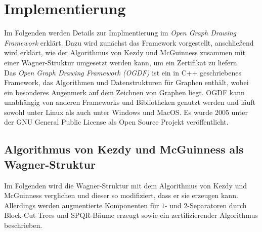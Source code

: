 \chapter{Implementierung}
\label{cha:implementierung}

Im Folgenden werden Details zur Implmentierung im \emph{Open Graph Drawing Framework} erklärt.
Dazu wird zunächst das Framework vorgestellt, anschließend wird erklärt, wie der Algorithmus von Kezdy und McGuinness zusammen mit einer Wagner-Struktur umgesetzt werden kann, um ein Zertifikat zu liefern.
\ \\

Das \emph{Open Graph Drawing Framework (OGDF)} ist ein in C++ geschriebenes Framework, das Algorithmen und Datenstrukturen für Graphen enthält, wobei ein besonderes Augenmerk auf dem Zeichnen von Graphen liegt.
OGDF kann unabhängig von anderen Frameworks und Bibliotheken genutzt werden und läuft sowohl unter Linux als auch unter Windows und MacOS.
Es wurde 2005 unter der GNU General Public License als Open Source Projekt veröffentlicht\cite{OGDFAbout}\cite{CGJK+2014}.

\section{Algorithmus von Kezdy und McGuinness als Wagner-Struktur}
Im Folgenden wird die Wagner-Struktur mit dem Algorithmus von Kezdy und McGuinness verglichen und dieser so modifiziert, dass er sie erzeugen kann.
Allerdings werden augmentierte Komponenten für $1$- und $2$-Separatoren durch Block-Cut Trees und SPQR-Bäume erzeugt sowie ein zertifizierender Algorithmus beschrieben.

